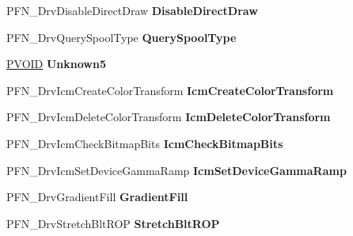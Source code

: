 \begin{DoxyCompactItemize}
P\+F\+N\+\_\+\+Drv\+Disable\+Direct\+Draw {\bfseries Disable\+Direct\+Draw}
\item 
\mbox{\label{struct___d_r_i_v_e_r___f_u_n_c_t_i_o_n_s_a23f227add3221b982a46203c6b6cea53}} 
P\+F\+N\+\_\+\+Drv\+Query\+Spool\+Type {\bfseries Query\+Spool\+Type}
\item 
\mbox{\label{struct___d_r_i_v_e_r___f_u_n_c_t_i_o_n_s_a621589106ed46fb39202cab5dae4f392}} 
\hyperlink{interfacevoid}{P\+V\+O\+ID} {\bfseries Unknown5}
\item 
\mbox{\label{struct___d_r_i_v_e_r___f_u_n_c_t_i_o_n_s_aee4384b5f2fc24a90f31769df03a92e3}} 
P\+F\+N\+\_\+\+Drv\+Icm\+Create\+Color\+Transform {\bfseries Icm\+Create\+Color\+Transform}
\item 
\mbox{\label{struct___d_r_i_v_e_r___f_u_n_c_t_i_o_n_s_a16575ab2730040c5df98fa0f83f913bd}} 
P\+F\+N\+\_\+\+Drv\+Icm\+Delete\+Color\+Transform {\bfseries Icm\+Delete\+Color\+Transform}
\item 
\mbox{\label{struct___d_r_i_v_e_r___f_u_n_c_t_i_o_n_s_ae8cccb9d21e453ab9244f2f127f9e50c}} 
P\+F\+N\+\_\+\+Drv\+Icm\+Check\+Bitmap\+Bits {\bfseries Icm\+Check\+Bitmap\+Bits}
\item 
\mbox{\label{struct___d_r_i_v_e_r___f_u_n_c_t_i_o_n_s_afda17f804fcccb4d646365dee15db68b}} 
P\+F\+N\+\_\+\+Drv\+Icm\+Set\+Device\+Gamma\+Ramp {\bfseries Icm\+Set\+Device\+Gamma\+Ramp}
\item 
\mbox{\label{struct___d_r_i_v_e_r___f_u_n_c_t_i_o_n_s_ae036f7888dfa10d8102dd35d98667a2f}} 
P\+F\+N\+\_\+\+Drv\+Gradient\+Fill {\bfseries Gradient\+Fill}
\item 
\mbox{\label{struct___d_r_i_v_e_r___f_u_n_c_t_i_o_n_s_a48f48d5b01581eac0c68984592c9e54b}} 
P\+F\+N\+\_\+\+Drv\+Stretch\+Blt\+R\+OP {\bfseries Stretch\+Blt\+R\+OP}
\item 
\mbox{\label{struct___d_r_i_v_e_r___f_u_n_c_t_i_o_n_s_a501cd568b54faf077332007fdff66fc3}} 

\end{DoxyCompactItemize}
